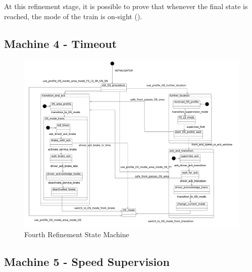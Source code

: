 \documentclass{template/openetcs_article}
\begin{document}
At this refinement stage, it is possible to prove that whenever the final state
is reached, the mode of the train is on-sight ().

{\footnotesize

}

\subsection{Machine 4 - Timeout}
\label{sec:machine-4-timeout}


\begin{figure}[ht]
  \centering
  \includegraphics[width=.95\textwidth]{m4_timeout_on_sight_procedure}
  \caption{Fourth Refinement State Machine}
  \label{fig:fourth-refinement-state-machine}
\end{figure}

{\footnotesize

}

\subsection{Machine 5 - Speed Supervision}
\label{sec:machine-5-speed}

{\footnotesize

}



\end{document}
